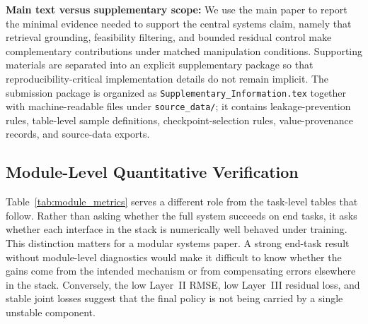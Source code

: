 \documentclass[12pt]{article}
\begin{document}
\textbf{Main text versus supplementary scope:} We use the main paper to report the minimal evidence needed to support the central systems claim, namely that retrieval grounding, feasibility filtering, and bounded residual control make complementary contributions under matched manipulation conditions. Supporting materials are separated into an explicit supplementary package so that reproducibility-critical implementation details do not remain implicit. The submission package is organized as \texttt{Supplementary\_Information.tex} together with machine-readable files under \texttt{source\_data/}; it contains leakage-prevention rules, table-level sample definitions, checkpoint-selection rules, value-provenance records, and source-data exports.

\subsection{Module-Level Quantitative Verification}

\begin{table}[!htbp]
\centering
\caption{Module-level validation metrics for the reproduced S2P2E stack. Metrics are taken from the best checkpoints of the reported reproduction pipeline.}
\label{tab:module_metrics}
\small\setlength{\tabcolsep}{5pt}
\end{table}

Table~\ref{tab:module_metrics} serves a different role from the task-level tables that follow. Rather than asking whether the full system succeeds on end tasks, it asks whether each interface in the stack is numerically well behaved under training. This distinction matters for a modular systems paper. A strong end-task result without module-level diagnostics would make it difficult to know whether the gains come from the intended mechanism or from compensating errors elsewhere in the stack. Conversely, the low Layer~II RMSE, low Layer~III residual loss, and stable joint losses suggest that the final policy is not being carried by a single unstable component.
\end{document}
